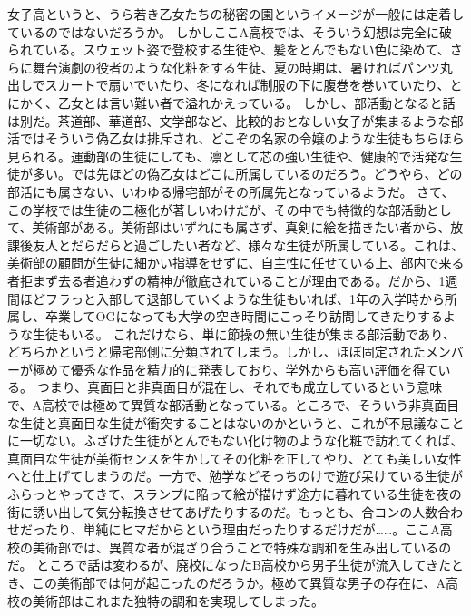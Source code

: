 女子高というと、うら若き乙女たちの秘密の園というイメージが一般には定着しているのではないだろうか。
しかしここA高校では、そういう幻想は完全に破られている。スウェット姿で登校する生徒や、髪をとんでもない色に染めて、さらに舞台演劇の役者のような化粧をする生徒、夏の時期は、暑ければパンツ丸出しでスカートで扇いでいたり、冬になれば制服の下に腹巻を巻いていたり、とにかく、乙女とは言い難い者で溢れかえっている。
しかし、部活動となると話は別だ。茶道部、華道部、文学部など、比較的おとなしい女子が集まるような部活ではそういう偽乙女は排斥され、どこぞの名家の令嬢のような生徒もちらほら見られる。運動部の生徒にしても、凛として芯の強い生徒や、健康的で活発な生徒が多い。では先ほどの偽乙女はどこに所属しているのだろう。どうやら、どの部活にも属さない、いわゆる帰宅部がその所属先となっているようだ。
さて、この学校では生徒の二極化が著しいわけだが、その中でも特徴的な部活動として、美術部がある。美術部はいずれにも属さず、真剣に絵を描きたい者から、放課後友人とだらだらと過ごしたい者など、様々な生徒が所属している。これは、美術部の顧問が生徒に細かい指導をせずに、自主性に任せている上、部内で来る者拒まず去る者追わずの精神が徹底されていることが理由である。だから、1週間ほどフラっと入部して退部していくような生徒もいれば、1年の入学時から所属し、卒業してOGになっても大学の空き時間にこっそり訪問してきたりするような生徒もいる。
これだけなら、単に節操の無い生徒が集まる部活動であり、どちらかというと帰宅部側に分類されてしまう。しかし、ほぼ固定されたメンバーが極めて優秀な作品を精力的に発表しており、学外からも高い評価を得ている。
つまり、真面目と非真面目が混在し、それでも成立しているという意味で、A高校では極めて異質な部活動となっている。ところで、そういう非真面目な生徒と真面目な生徒が衝突することはないのかというと、これが不思議なことに一切ない。ふざけた生徒がとんでもない化け物のような化粧で訪れてくれば、真面目な生徒が美術センスを生かしてその化粧を正してやり、とても美しい女性へと仕上げてしまうのだ。一方で、勉学などそっちのけで遊び呆けている生徒がふらっとやってきて、スランプに陥って絵が描けず途方に暮れている生徒を夜の街に誘い出して気分転換させてあげたりするのだ。もっとも、合コンの人数合わせだったり、単純にヒマだからという理由だったりするだけだが……。ここA高校の美術部では、異質な者が混ざり合うことで特殊な調和を生み出しているのだ。
ところで話は変わるが、廃校になったB高校から男子生徒が流入してきたとき、この美術部では何が起こったのだろうか。極めて異質な男子の存在に、A高校の美術部はこれまた独特の調和を実現してしまった。

